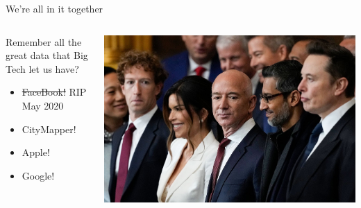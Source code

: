 \documentclass[
  ignorenonframetext,
]{beamer}
\providecommand{\tightlist}{%
  \setlength{\itemsep}{0pt}\setlength{\parskip}{0pt}}\usepackage{longtable,booktabs,array}
\begin{document}
\begin{frame}{We're all in it together}
\label{were-all-in-it-together-1}
\begin{columns}[T]
\begin{column}{0.6\textwidth}
Remember all the great data that Big Tech let us have?

\begin{itemize}
\tightlist
\item
  \st{FaceBook!} RIP May 2020
\item
  CityMapper!
\item
  Apple!
\item
  Google!
\end{itemize}
\end{column}

\begin{column}{0.4\textwidth}
\includegraphics{images/tech_knobs.jpeg}
\end{column}
\end{columns}
\end{frame}
\end{document}
